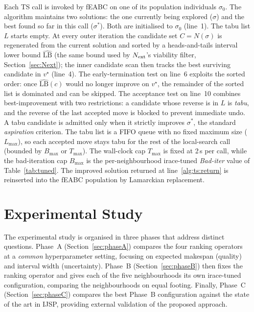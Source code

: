 \documentclass[preprint,12pt]{elsarticle}
\begin{document}
Each TS call is invoked by fEABC on one of its population individuals $\sigma_0$. The algorithm maintains two solutions: the one currently being explored ($\sigma$) and the best found so far in this call ($\sigma^{\ast}$). Both are initialised to $\sigma_0$ (line~1). The tabu list $L$ starts empty. At every outer iteration the candidate set $C = N(\sigma)$ is regenerated from the current solution and sorted by a heads-and-tails interval lower bound $\widehat{\text{LB}}$ (the same bound used by $N_{\rm ext}$'s viability filter, Section~\ref{sec:Next}); the inner candidate scan then tracks the best surviving candidate in $v^{\star}$ (line~4). The early-termination test on line~6 exploits the sorted order: once $\widehat{\text{LB}}(c)$ would no longer improve on $v^{\star}$, the remainder of the sorted list is dominated and can be skipped. The acceptance test on line~10 combines best-improvement with two restrictions: a candidate whose reverse is in $L$ is \emph{tabu}, and the reverse of the last accepted move is blocked to prevent immediate undo. A tabu candidate is admitted only when it strictly improves $\sigma^{\ast}$, the standard \emph{aspiration} criterion. The tabu list is a FIFO queue with no fixed maximum size ($L_{\max}$), so each accepted move stays tabu for the rest of the local-search call (bounded by $B_{\max}$ or $T_{\max}$). The wall-clock cap $T_{\max}$ is fixed at 2\,s per call, while the bad-iteration cap $B_{\max}$ is the per-neighbourhood irace-tuned \emph{Bad-iter} value of Table~\ref{tab:tuned}. The improved solution returned at line~\ref{alg:ts:return} is reinserted into the fEABC population by Lamarckian replacement.


\section{Experimental Study}
\label{sec:experiments}

The experimental study is organised in three phases that address distinct questions. Phase~A (Section~\ref{sec:phaseA}) compares the four ranking operators at a \emph{common} hyperparameter setting, focusing on expected makespan (quality) and interval width (uncertainty). Phase~B (Section~\ref{sec:phaseB}) then fixes the ranking operator and gives each of the five neighbourhoods its own irace-tuned configuration, comparing the neighbourhoods on equal footing. Finally, Phase~C (Section~\ref{sec:phaseC}) compares the best Phase~B configuration against the state of the art in IJSP, providing external validation of the proposed approach.
\end{document}

